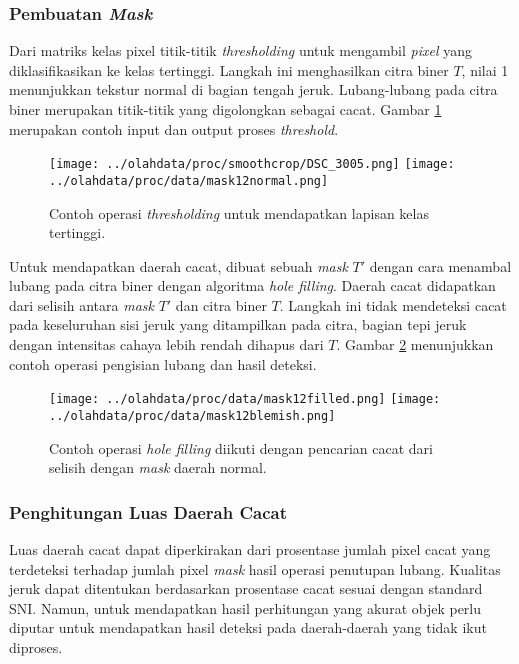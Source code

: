 \documentclass[laporan.tex]{subfiles}
\begin{document}
\subsubsection{Pembuatan \emph{Mask}}

Dari matriks kelas pixel titik-titik \emph{thresholding} untuk mengambil \emph{pixel} yang diklasifikasikan ke kelas tertinggi. Langkah ini menghasilkan citra biner $T$, nilai 1 menunjukkan tekstur normal di bagian tengah jeruk. Lubang-lubang pada citra biner merupakan titik-titik yang digolongkan sebagai cacat. Gambar \ref{fig:highmask} merupakan contoh input dan output proses \emph{threshold}.

\begin{figure}[h]
\centering
\texttt{[image: ../olahdata/proc/smoothcrop/DSC\_3005.png]} \qquad
\texttt{[image: ../olahdata/proc/data/mask12normal.png]}
\caption{Contoh operasi \emph{thresholding} untuk mendapatkan lapisan kelas tertinggi.}
\label{fig:highmask}
\end{figure}

Untuk mendapatkan daerah cacat, dibuat sebuah \emph{mask} $T'$ dengan cara menambal lubang pada citra biner dengan algoritma \emph{hole filling}. Daerah cacat didapatkan dari selisih antara \emph{mask} $T'$ dan citra biner $T$. Langkah ini tidak mendeteksi cacat pada keseluruhan sisi jeruk yang ditampilkan pada citra, bagian tepi jeruk dengan intensitas cahaya lebih rendah dihapus dari $T$. Gambar \ref{fig:holemask} menunjukkan contoh operasi pengisian lubang dan hasil deteksi.

\begin{figure}[h]
\centering
\texttt{[image: ../olahdata/proc/data/mask12filled.png]} \qquad
\texttt{[image: ../olahdata/proc/data/mask12blemish.png]}
\caption{Contoh operasi \emph{hole filling} diikuti dengan pencarian cacat dari selisih dengan \emph{mask} daerah normal.}
\label{fig:holemask}
\end{figure}

\subsubsection{Penghitungan Luas Daerah Cacat}

Luas daerah cacat dapat diperkirakan dari prosentase jumlah pixel cacat yang terdeteksi terhadap jumlah pixel \emph{mask} hasil operasi penutupan lubang. Kualitas jeruk dapat ditentukan berdasarkan prosentase cacat sesuai dengan standard SNI. Namun, untuk mendapatkan hasil perhitungan yang akurat objek perlu diputar untuk mendapatkan hasil deteksi pada daerah-daerah yang tidak ikut diproses.
\end{document}
